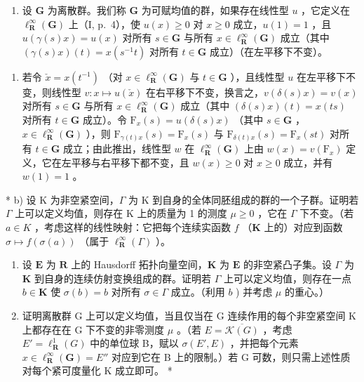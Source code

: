 \begin{enumerate}
\def\labelenumi{\arabic{enumi})}
\setcounter{enumi}{3}
\tightlist
\item
  设 \(\mathbf{G}\) 为离散群。我们称 \(\mathbf{G}\) 为可赋均值的群，如果存在线性型 \(u\) ，它定义在 \(\ell_{\mathbf{R}}^{\infty}(\mathbf{G})\) 上（I, p.~4），使 \(u(x) \geqslant 0\) 对 \(x \geqslant 0\) 成立，\(u(1) = 1\) ，且 \(u(\gamma(s)x) = u(x)\) 对所有 \(s \in \mathbf{G}\) 与所有 \(x \in \ell_{\mathbf{R}}^{\infty}(\mathbf{G})\) 成立（其中 \((\gamma(s)x)(t) = x(s^{-1}t)\) 对所有 \(t \in \mathbf{G}\) 成立）（在左平移下不变）。
\end{enumerate}

\begin{enumerate}
\def\labelenumi{\alph{enumi})}
\tightlist
\item
  若令 \(\check{x} = x(t^{-1})\) （对 \(x\in \ell_{\mathbf{R}}^{\infty}(\mathbf{G})\) 与 \(t\in \mathbf{G}\) ），且线性型 \(u\) 在左平移下不变，则线性型 \(v:x\mapsto u(\check{x})\) 在右平移下不变，换言之，\(v(\delta (s)x) = v(x)\) 对所有 \(s\in \mathbf{G}\) 与所有 \(x\in \ell_{\mathbf{R}}^{\infty}(\mathbf{G})\) 成立（其中 \((\delta (s)x)(t) = x(ts)\) 对所有 \(t\in \mathbf{G}\) 成立）。令 \(\mathrm{F}_x(s) = u(\delta (s)x)\) （其中 \(s\in \mathbf{G}\) ，\(x\in \ell_{\mathbf{R}}^{\infty}(\mathbf{G})\) ），则 \(\mathrm{F}_{\gamma (t)x}(s) = \mathrm{F}_x(s)\) 与 \(\mathrm{F}_{\delta (t)x}(s) = \mathrm{F}_x(st)\) 对所有 \(t\in \mathbf{G}\) 成立；由此推出，线性型 \(w\) 在 \(\ell_{\mathbf{R}}^{\infty}(\mathbf{G})\) 上由 \(w(x) = v(\mathrm{F}_x)\) 定义，它在左平移与右平移下都不变，且 \(w(x)\geqslant 0\) 对 \(x\geqslant 0\) 成立，并有 \(w(1) = 1\) 。
\end{enumerate}

* b) 设 K 为非空紧空间，\(\Gamma\) 为 K 到自身的全体同胚组成的群的一个子群。证明若 \(\Gamma\) 上可以定义均值，则存在 K 上的质量为 1 的测度 \(\mu \geqslant 0\) ，它在 \(\Gamma\) 下不变。（若 \(a \in K\) ，考虑这样的线性映射：它把每个连续实函数 \(f\) （\(\mathbf{K}\) 上的）对应到函数 \(\sigma \mapsto f(\sigma(a))\) （属于 \(\ell_{\mathbf{R}}^{\infty}(\Gamma)\) ）。

\begin{enumerate}
\def\labelenumi{\alph{enumi})}
\setcounter{enumi}{2}
\item
  设 \(\mathbf{E}\) 为 \(\mathbf{R}\) 上的 Hausdorff 拓扑向量空间，\(\mathbf{K}\) 为 \(\mathbf{E}\) 的非空紧凸子集。设 \(\Gamma\) 为 \(\mathbf{K}\) 到自身的连续仿射变换组成的群。证明若 \(\Gamma\) 上可以定义均值，则存在一点 \(b \in \mathbf{K}\) 使 \(\sigma(b) = b\) 对所有 \(\sigma \in \Gamma\) 成立。（利用 \(b\) ) 并考虑 \(\mu\) 的重心。）
\item
  证明离散群 G 上可以定义均值，当且仅当在 G 连续作用的每个非空紧空间 K 上都存在在 G 下不变的非零测度 \(\mu\) 。（若 \(E = \overline{\mathcal{K}(G)}\) ，考虑 \(E' = \ell_{\mathbf{R}}^{1}(G)\) 中的单位球 B，赋以 \(\sigma(E', E)\) ，并把每个元素 \(x \in \ell_{\mathbf{R}}^{\infty}(\mathbf{G}) = E''\) 对应到它在 B 上的限制。）若 G 可数，则只需上述性质对每个紧可度量化 K 成立即可。 *
\end{enumerate}

